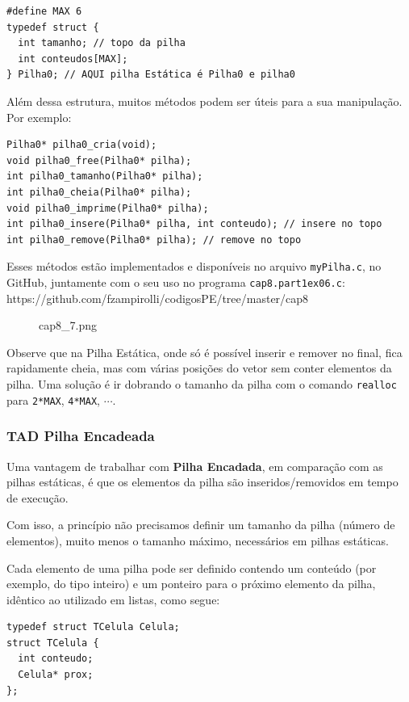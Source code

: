 \documentclass[12pt,a4paper]{article}
\begin{document}
\begin{verbatim}
#define MAX 6
typedef struct {
  int tamanho; // topo da pilha
  int conteudos[MAX];
} Pilha0; // AQUI pilha Estática é Pilha0 e pilha0
\end{verbatim}

Além dessa estrutura, muitos métodos podem ser úteis para a sua
manipulação. Por exemplo:

\begin{verbatim}
Pilha0* pilha0_cria(void);
void pilha0_free(Pilha0* pilha);
int pilha0_tamanho(Pilha0* pilha);
int pilha0_cheia(Pilha0* pilha);
void pilha0_imprime(Pilha0* pilha);
int pilha0_insere(Pilha0* pilha, int conteudo); // insere no topo
int pilha0_remove(Pilha0* pilha); // remove no topo
\end{verbatim}

Esses métodos estão implementados e disponíveis no arquivo
\texttt{myPilha.c}, no GitHub, juntamente com o seu uso no programa
\texttt{cap8.part1ex06.c}:
https://github.com/fzampirolli/codigosPE/tree/master/cap8

    \begin{figure}
\centering
\caption{cap8\_7.png}
\end{figure}

    Observe que na Pilha Estática, onde só é possível inserir e remover no
final, fica rapidamente cheia, mas com várias posições do vetor sem
conter elementos da pilha. Uma solução é ir dobrando o tamanho da pilha
com o comando \texttt{realloc} para \texttt{2*MAX}, \texttt{4*MAX},
\(\cdots\).

    \hypertarget{tad-pilha-encadeada}{%
\subsubsection{TAD Pilha Encadeada}\label{tad-pilha-encadeada}}

    Uma vantagem de trabalhar com \textbf{Pilha Encadada}, em comparação com
as pilhas estáticas, é que os elementos da pilha são inseridos/removidos
em tempo de execução.

Com isso, a princípio não precisamos definir um tamanho da pilha (número
de elementos), muito menos o tamanho máximo, necessários em pilhas
estáticas.

Cada elemento de uma pilha pode ser definido contendo um conteúdo (por
exemplo, do tipo inteiro) e um ponteiro para o próximo elemento da
pilha, idêntico ao utilizado em listas, como segue:

\begin{verbatim}
typedef struct TCelula Celula;
struct TCelula {
  int conteudo;
  Celula* prox;
};
\end{verbatim}
\end{document}
